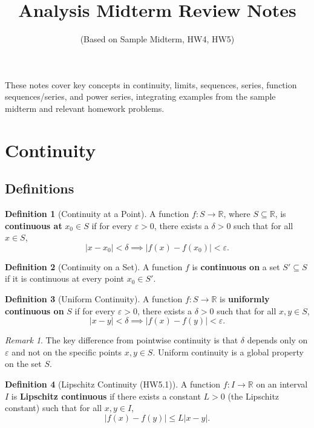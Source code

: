 \documentclass{article}
\title{Analysis Midterm Review Notes}
\author{(Based on Sample Midterm, HW4, HW5)}
\date{}
\theoremstyle{definition}
\newtheorem{definition}{Definition}[section]
\theoremstyle{plain}
\theoremstyle{remark}
\newtheorem{remark}{Remark}[section]
\newcommand{\R}{\mathbb{R}}
\newcommand{\eps}{\varepsilon}
\begin{document}
\maketitle

These notes cover key concepts in continuity, limits, sequences, series, function sequences/series, and power series, integrating examples from the sample midterm and relevant homework problems.

\section{Continuity}

\subsection{Definitions}

\begin{definition}[Continuity at a Point{\cite[Def 17.1]{Ross}}]
A function \( f : S \to \R \), where \(S \subseteq \R\), is \textbf{continuous at} \( x_0 \in S \) if for every \(\eps > 0\), there exists a \(\delta > 0\) such that for all \(x \in S\),
\[ |x - x_0| < \delta \implies |f(x) - f(x_0)| < \eps. \]
\end{definition}

\begin{definition}[Continuity on a Set{\cite[Def 17.1]{Ross}}]
A function \(f\) is \textbf{continuous on} a set \(S' \subseteq S\) if it is continuous at every point \(x_0 \in S'\).
\end{definition}

\begin{definition}[Uniform Continuity{\cite[Def 19.1]{Ross}}]
A function \( f : S \to \R \) is \textbf{uniformly continuous on} \(S\) if for every \(\eps > 0\), there exists a \(\delta > 0\) such that for all \(x, y \in S\),
\[ |x - y| < \delta \implies |f(x) - f(y)| < \eps. \]
\end{definition}

\begin{remark}
The key difference from pointwise continuity is that \(\delta\) depends only on \(\eps\) and not on the specific points \(x, y \in S\). Uniform continuity is a global property on the set \(S\).
\end{remark}

\begin{definition}[Lipschitz Continuity (HW5.1)]
A function \( f : I \to \R \) on an interval \(I\) is \textbf{Lipschitz continuous} if there exists a constant \(L > 0\) (the Lipschitz constant) such that for all \(x, y \in I\),
\[ |f(x) - f(y)| \le L |x-y|. \]
\end{definition}
\end{document}
